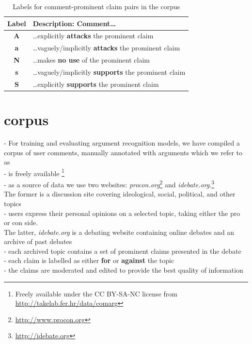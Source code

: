 \begin{table}
\centering
{\small
\begin{tabular}{cl}
\toprule
Label & Description: Comment\dots \\
\midrule
\textbf{A} & \dots explicitly \textbf{attacks} the prominent claim \\
\textbf{a} & \dots vaguely/implicitly \textbf{attacks} the prominent claim \\
\textbf{N} & \dots makes \textbf{no use} of the prominent claim \\
\textbf{s} & \dots vaguely/implicitly \textbf{supports} the prominent claim \\
\textbf{S} & \dots explicitly \textbf{supports} the prominent claim \\
\bottomrule
\end{tabular}
}
\caption{Labels for comment-prominent claim pairs in the \ComArg corpus}
\label{tab:comarg-labels}
\end{table}

\section{\ComArg corpus}
\label{sec:comarg}

- For training and evaluating argument recognition models,
we have compiled a corpus of user comments, manually annotated
with arguments which we refer to as \ComArg \\
- \ComArg is freely available
\footnote{Freely available under the CC BY-SA-NC license from \url{http://takelab.fer.hr/data/comarg}} \\
- as a source of data we use two websites: 
\emph{procon.org}\footnote{\url{http://www.procon.org}} and 
\textit{idebate.org}.\footnote{\url{http://idebate.org}} \\
The former is a discussion site covering ideological, social, political,
and other topics \\
- users express their personal opinions on a selected topic, taking either
the pro or con side. \\
The latter, \textit{idebate.org} is a debating website containing
online debates and an archive of past debates \\
- each archived topic contains a set of prominent claims 
presented in the debate \\
- each claim is labelled as either \textbf{for} or \textbf{against} the topic \\
- the claims are moderated and edited to provide the best quality of information \\

